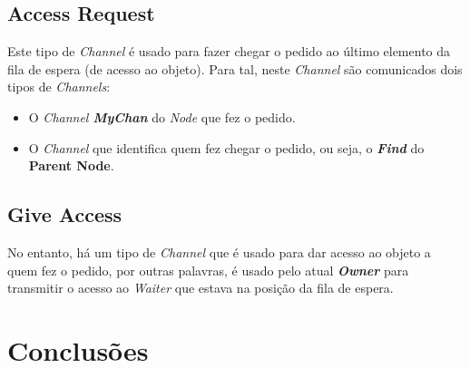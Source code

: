 \subsection{Access Request}
Este tipo de \emph{Channel} é usado para fazer chegar o pedido ao último elemento da fila de espera (de acesso ao objeto). Para tal, neste \emph{Channel} são comunicados dois tipos de \emph{Channels}:
\begin{itemize}
    \item O \emph{Channel \textbf{MyChan}} do \emph{Node} que fez o pedido.
    \item O \emph{Channel} que identifica quem fez chegar o pedido, ou seja, o \emph{\textbf{Find}} do \textbf{Parent Node}.
\end{itemize}


\subsection{Give Access}
No entanto, há um tipo de \emph{Channel} que é usado para dar acesso ao objeto a quem fez o pedido, por outras palavras, é usado pelo atual \emph{\textbf{Owner}} para transmitir o acesso ao \emph{Waiter} que estava na posição da fila de espera.

\section{Conclusões}
